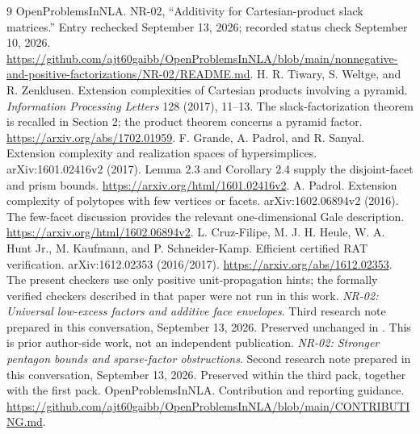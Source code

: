 \documentclass[11pt,a4paper]{article}
\theoremstyle{definition}\newtheorem{definition}[theorem]{Definition}
\theoremstyle{remark}\newtheorem{remark}[theorem]{Remark}
\begin{document}
\clearpage
{}
{}
\begin{thebibliography}{9}
 OpenProblemsInNLA. NR-02, ``Additivity for Cartesian-product slack
matrices.'' Entry rechecked September 13, 2026; recorded status check
September 10, 2026.
\url{https://github.com/ajt60gaibb/OpenProblemsInNLA/blob/main/nonnegative-and-positive-factorizations/NR-02/README.md}.
 H. R. Tiwary, S. Weltge, and R. Zenklusen. Extension complexities
of Cartesian products involving a pyramid. \emph{Information Processing
Letters} 128 (2017), 11--13. The slack-factorization theorem is recalled in
Section 2; the product theorem concerns a pyramid factor.
\url{https://arxiv.org/abs/1702.01959}.
 F. Grande, A. Padrol, and R. Sanyal. Extension complexity and
realization spaces of hypersimplices. arXiv:1601.02416v2 (2017). Lemma 2.3 and
Corollary 2.4 supply the disjoint-facet and prism bounds.
\url{https://arxiv.org/html/1601.02416v2}.
 A. Padrol. Extension complexity of polytopes with few vertices
or facets. arXiv:1602.06894v2 (2016). The few-facet discussion provides the
relevant one-dimensional Gale description.
\url{https://arxiv.org/html/1602.06894v2}.
 L. Cruz-Filipe, M. J. H. Heule, W. A. Hunt Jr., M. Kaufmann,
and P. Schneider-Kamp. Efficient certified RAT verification.
arXiv:1612.02353 (2016/2017).
\url{https://arxiv.org/abs/1612.02353}.
The present checkers use only positive unit-propagation hints; the formally
verified checkers described in that paper were not run in this work.
 \emph{NR-02: Universal low-excess factors and additive face
envelopes}. Third research note prepared in this conversation, September 13,
2026. Preserved unchanged in .
This is prior author-side work, not an independent publication.
 \emph{NR-02: Stronger pentagon bounds and sparse-factor
obstructions}. Second research note prepared in this conversation, September
13, 2026. Preserved within the third pack, together with the first pack.
 OpenProblemsInNLA. Contribution and reporting guidance.
\url{https://github.com/ajt60gaibb/OpenProblemsInNLA/blob/main/CONTRIBUTING.md}.
\end{thebibliography}
\end{document}
